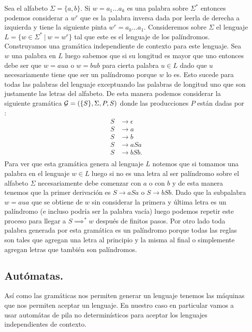 \documentclass[tesis.tex]{subfiles}
\begin{document}
\begin{ej}
	Sea el alfabeto $\Sigma = \{ a,b \}$. Si $w=a_1 \dots a_k$ es una palabra sobre $\Sigma^*$ entonces podemos considerar a $w^r$ que es la palabra inversa dada por leerla de derecha a izquierda y tiene la siguiente pinta $w^r= a_k \dots a_1$. Consideremos sobre $\Sigma$ el lenguaje $L = \{ w \in \Sigma^* \ | \ w = w^r  \}$ tal que este es el lenguaje de los palíndromos. Construyamos una gramática independiente de contexto para este lenguaje. Sea $w$ una palabra en $L$ luego sabemos que si su longitud es mayor que uno entonces debe ser que $w = a u a$ o $w = b u b$ para cierta palabra $u \in L$ dado que $u$ necesariamente tiene que ser un palíndromo porque $w$ lo es. Esto sucede para todas las palabras del lenguaje exceptuando las palabras de longitud uno que son justamente las letras del alfabeto. De esta manera podemos considerar la siguiente gramática ${\cal G}  =  (\{S\}, \Sigma, P, S )$ donde las producciones $P$ están dadas por :
	\begin{align*}
	S  & \to \epsilon \\ S &\to a \\ S &\to b \\ S &\to  aSa \\ S &\to bSb. \\
	\end{align*}
	Para ver que esta gramática genera al lenguaje $L$ notemos que si tomamos una palabra en el lenguaje $w \in L$ luego si no es una letra al ser palíndromo sobre el alfabeto $\Sigma$ necesariamente debe comenzar con $a$ o con $b$ y de esta manera tenemos que la primer derivación es $S \to aSa$ o $S \to bSb$. Dado que la subpalabra $w = aua$ que se obtiene de $w$ sin considerar la primera y última letra es un palíndromo (e incluso podría ser la palabra vacía) luego podemos repetir este proceso para llegar a $S \implies^* w$ después de finitos pasos. Por otro lado toda palabra generada por esta gramática es un palíndromo porque todas las reglas son tales que agregan una letra al principio y la misma al final o simplemente agregan letras que también son palíndromos.
	
\end{ej}

\subsection{Autómatas.}
Así como las gramáticas nos permiten generar un lenguaje tenemos las máquinas que nos permiten aceptar un lenguaje. En nuestro caso en particular vamos a usar automátas de pila no determinísticos para aceptar los lenguajes independientes de contexto.
\end{document}
